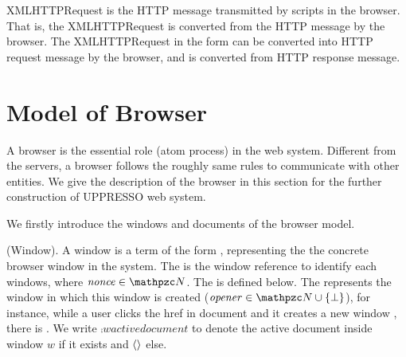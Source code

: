 \begin{definition}[XMLHTTPREQUESTs]
XMLHTTPRequest is the HTTP message transmitted  by scripts in the browser. That is, the XMLHTTPRequest is converted from the HTTP message by the browser. The XMLHTTPRequest in the form  can be converted into HTTP request message by the browser, and   is converted from HTTP response message.
\end{definition}


\section{Model of Browser}
\label{app:browser}
A browser is the essential role (atom process) in the web system. Different from the servers, a browser follows the roughly same rules to communicate with other entities. We give the description of the browser in this  section for the further construction of UPPRESSO web system.

We firstly introduce the windows and documents of the browser model.


\begin{definition}(Window).
A window  is a term of the form , representing the the concrete browser window in the system. The  is the window reference to identify each windows, where $\mi{nonce} \in \nonces$. 
The  is defined below.
The  represents the window in which this window is created ($\mi{opener} \in \nonces \cup \{\bot\}$), for instance, while a user clicks the href in document  and it creates a new window , there is . We write $\comp{w}{activedocument}$ to denote
    the active document inside window $w$ if it exists and
    $\langle\rangle$ else.
\end{definition}

